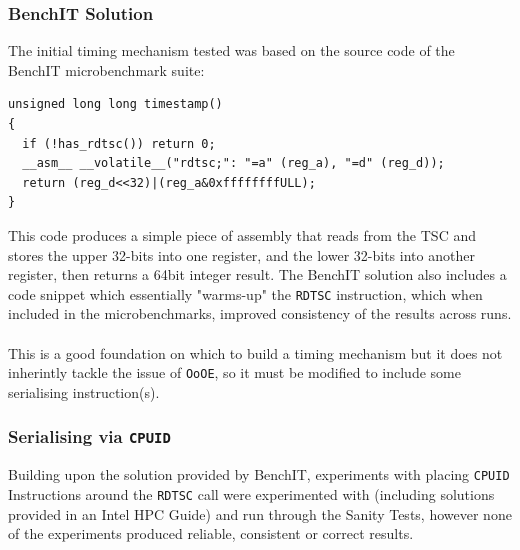 \documentclass[bsc,frontabs,twoside,singlespacing,parskip,deptreport]{infthesis}     %
\begin{document}
\subsubsection{BenchIT Solution\cite{benchit_src}}\label{benchit-disc}
The initial timing mechanism tested was based on the source code of the BenchIT microbenchmark suite:
\begin{verbatim}
unsigned long long timestamp()
{
  if (!has_rdtsc()) return 0;
  __asm__ __volatile__("rdtsc;": "=a" (reg_a), "=d" (reg_d));
  return (reg_d<<32)|(reg_a&0xffffffffULL);
}
\end{verbatim}
This code produces a simple piece of assembly that reads from the TSC and stores the upper 32-bits into one register, and the lower 32-bits into another register, then returns a 64bit integer result. The BenchIT solution also includes a code snippet which essentially "warms-up" the \texttt{RDTSC} instruction, which when included in the microbenchmarks, improved consistency of the results across runs.\\
\\
This is a good foundation on which to build a timing mechanism but it does not inherintly tackle the issue of \texttt{OoOE}, so it must be modified to include some serialising instruction(s).

\subsubsection{Serialising via \texttt{CPUID}}
Building upon the solution provided by BenchIT, experiments with placing \texttt{CPUID} Instructions around the \texttt{RDTSC} call were experimented with (including solutions provided in an Intel HPC Guide\cite{intel_hpc_guide}) and run through the Sanity Tests, however none of the experiments produced reliable, consistent or correct results.
\end{document}
